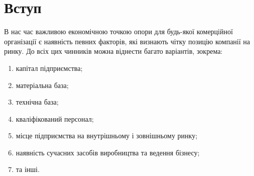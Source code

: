 




\fontsize{14}{14pt}\selectfont

\maketitle


\tableofcontents


%

\section{Вступ}
В нас час важливою економічною точкою опори для будь-якої комерційної організації є наявність певних факторів, які визнають чітку позицію компанії на ринку. До всіх цих чинників можна віднести багато варіантів, зокрема:
\begin{enumerate}
\item капітал підприємства;
\item матеріальна база;
\item технічна база;
\item кваліфікований персонал;
\item місце підприємства на внутрішньому і зовнішньому ринку;
\item наявність сучасних засобів виробництва та ведення бізнесу;
\item та інші.
\end{enumerate}

